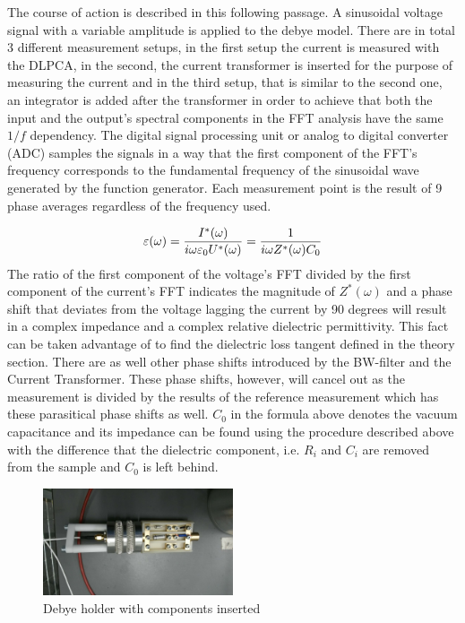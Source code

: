The course of action is described in this following passage.
\newline
A sinusoidal voltage signal with a variable amplitude is applied to the debye model. There are in total 3 different measurement setups,
in the first setup the current is measured with the DLPCA, in the second, the current transformer is inserted for the purpose of measuring 
the current and in the third setup, that is similar to the second one, an integrator is added after the transformer in order
to achieve that both the input and the output's spectral components in the FFT analysis have the same $1/f$ dependency.
The digital signal processing unit or analog to digital converter (ADC) samples the signals in a way that 
the first component of the FFT's frequency corresponds to the fundamental frequency
of the sinusoidal wave generated by the function generator. Each measurement point is the result of 9 phase averages regardless of the frequency used.



\begin{equation}
\varepsilon(\omega)=\frac{I^*(\omega)}{i \omega \varepsilon_0 U^*(\omega)} = \frac{1}{i \omega Z^*(\omega) C_0}\\
\end{equation}
The ratio of the first component of the voltage's FFT divided by the first component of the current's FFT indicates the magnitude
of $Z^*(\omega)$ and a phase shift that deviates from the voltage lagging the current by 90 degrees will result in a complex impedance and a complex relative dielectric permittivity. This fact can be taken advantage of to find the dielectric loss tangent defined in the theory section. There are as well other phase shifts introduced by the BW-filter and the Current Transformer. These phase shifts, however, will cancel out as the measurement is divided by the results of the reference measurement which has these parasitical phase shifts as well. 
\newline
$C_0$ in the formula above denotes the vacuum capacitance and its impedance can be found using the procedure described above with the difference that
the dielectric component, i.e. $R_i$ and $C_i$ are removed from the sample and $C_0$ is left behind.

\begin{figure}[h!tb]
 \centering

 \includegraphics[width=0.5\textwidth]{figures/Method/Experimentaufbau/debyesample}
 \caption[Kurze Abbildungsbeschreibung]{Debye holder with components inserted}

 
 
 \end{figure}

